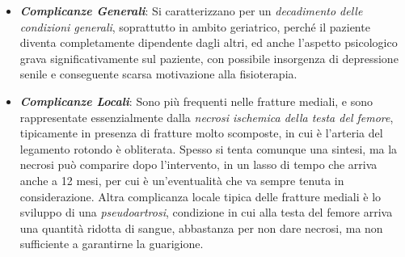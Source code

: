 \documentclass[]{article}
\begin{document}
\begin{itemize}
\item
  \textbf{\emph{Complicanze Generali}}: Si caratterizzano per un
  \emph{decadimento delle condizioni generali}, soprattutto in ambito
  geriatrico, perché il paziente diventa completamente dipendente dagli
  altri, ed anche l'aspetto psicologico grava significativamente sul
  paziente, con possibile insorgenza di depressione senile e conseguente
  scarsa motivazione alla fisioterapia.
\item
  \textbf{\emph{Complicanze Locali}}: Sono più frequenti nelle fratture
  mediali, e sono rappresentate essenzialmente dalla \emph{necrosi
  ischemica della testa del femore}, tipicamente in presenza di fratture
  molto scomposte, in cui è l'arteria del legamento rotondo è
  obliterata. Spesso si tenta comunque una sintesi, ma la necrosi può
  comparire dopo l'intervento, in un lasso di tempo che arriva anche a
  12 mesi, per cui è un'eventualità che va sempre tenuta in
  considerazione. Altra complicanza locale tipica delle fratture mediali
  è lo sviluppo di una \emph{pseudoartrosi}, condizione in cui alla
  testa del femore arriva una quantità ridotta di sangue, abbastanza per
  non dare necrosi, ma non sufficiente a garantirne la guarigione.
\end{itemize}
\end{document}
